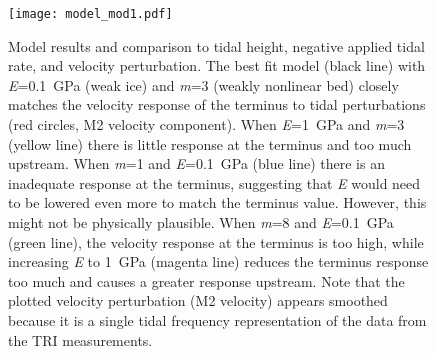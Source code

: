 \begin{figure}
\centering
\texttt{[image: model\_mod1.pdf]}
\caption[Model results and comparison to tidal height, negative applied tidal rate, and velocity perturbation.]{Model results and comparison to tidal height, negative applied tidal rate, and velocity perturbation. The best fit model (black line) with \textit{E}=0.1~GPa (weak ice) and \textit{m}=3 (weakly nonlinear bed) closely matches the velocity response of the terminus to tidal perturbations (red circles, M2 velocity component). When \textit{E}=1~GPa and \textit{m}=3 (yellow line) there is little response at the terminus and too much upstream. When \textit{m}=1 and \textit{E}=0.1~GPa (blue line) there is an inadequate response at the terminus, suggesting that \textit{E} would need to be lowered even more to match the terminus value. However, this might not be physically plausible. When \textit{m}=8 and \textit{E}=0.1~GPa (green line), the velocity response at the terminus is too high, while increasing \textit{E} to 1~GPa (magenta line) reduces the terminus response too much and causes a greater response upstream. Note that the plotted velocity perturbation (M2 velocity) appears smoothed because it is a single tidal frequency representation of the data from the TRI measurements. }
\label{fig:model}
\end{figure}



% 
